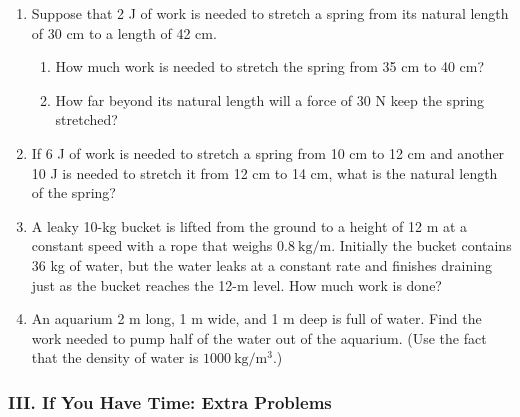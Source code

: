 \documentclass[12pt]{article}
\begin{document}
\begin{enumerate}
    \item Suppose that 2 J of work is needed to stretch a spring from its natural length of 30 cm to a length of 42 cm.
    
    \begin{enumerate}
        \item How much work is needed to stretch the spring from 35 cm
        to 40 cm?
        \item How far beyond its natural length will a force of 30 N keep
        the spring stretched?
    \end{enumerate}

    \item If 6 J of work is needed to stretch a spring from 10 cm to 12 cm and another 10 J is needed to stretch it from 12 cm to 14 cm, what is the natural length of the spring?
    
    \item A leaky 10-kg bucket is lifted from the ground to a height of 12 m at a constant speed with a rope that weighs $0.8\ \mathrm{kg/m}$. Initially the bucket contains 36 kg of water, but the water leaks at a constant rate and finishes draining just as the bucket reaches the 12-m level. How much work is done?

    \item An aquarium 2 m long, 1 m wide, and 1 m deep is full of water. Find the work needed to pump half of the water out of the aquarium. (Use the fact that the density of water is $1000\ \mathrm{kg/m^3}$.)


\end{enumerate}


\subsubsection*{III. If You Have Time: Extra Problems}
\end{document}
